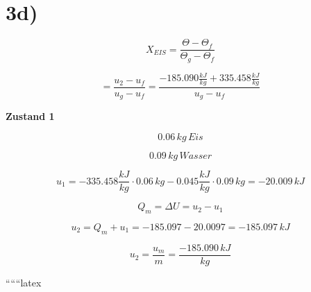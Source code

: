 

\section*{3d)}

\begin{equation*}
    X_{EIS} = \frac{\Theta - \Theta_f}{\Theta_g - \Theta_f}
\end{equation*}

\begin{equation*}
    = \frac{u_2 - u_f}{u_g - u_f} = \frac{-185.090 \frac{kJ}{kg} + 335.458 \frac{kJ}{kg}}{u_g - u_f}
\end{equation*}

\textbf{Zustand 1}

\begin{equation*}
    0.06 \, kg \, Eis
\end{equation*}

\begin{equation*}
    0.09 \, kg \, Wasser
\end{equation*}

\begin{equation*}
    u_1 = -335.458 \frac{kJ}{kg} \cdot 0.06 \, kg - 0.045 \frac{kJ}{kg} \cdot 0.09 \, kg = -20.009 \, kJ
\end{equation*}

\begin{equation*}
    Q_m = \Delta U = u_2 - u_1
\end{equation*}

\begin{equation*}
    u_2 = Q_m + u_1 = -185.097 - 20.0097 = -185.097 \, kJ
\end{equation*}

\begin{equation*}
    u_2 = \frac{u_m}{m} = \frac{-185.090 \, kJ}{kg}
\end{equation*}

``````latex